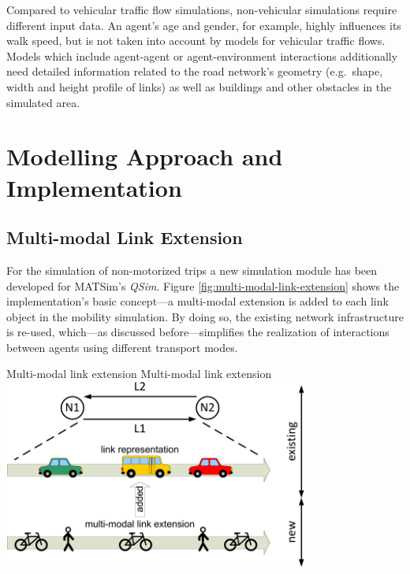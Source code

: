 Compared to vehicular traffic flow simulations, non-vehicular simulations require different input data. An agent's age and gender, for example, highly influences its walk speed, but is not taken into account by models for vehicular traffic flows. Models which include agent-agent or agent-environment interactions additionally need detailed information related to the road network's geometry (e.g.~shape, width and height profile of links) as well as buildings and other obstacles in the simulated area.

\section{Modelling Approach and Implementation}
\subsection{Multi-modal Link Extension} \label{sec:Multi-modalSimulation}
For the simulation of non-motorized trips a new simulation module has been developed for MATSim's \emph{QSim}. Figure \ref{fig:multi-modal-link-extension} shows the implementation's basic concept---a multi-modal extension is added to each link object in the mobility simulation. By doing so, the existing network infrastructure is re-used, which---as discussed before---simplifies the realization of interactions between agents using different transport modes.

\createfigure%
{Multi-modal link extension}%
{Multi-modal link extension}%
{\label{fig:multi-modal-link-extension}}%
{\includegraphics[width=0.75\textwidth, angle=0]{extending/figures/MultiModalSimulation/multi-modal-link-extension}}%
{}

